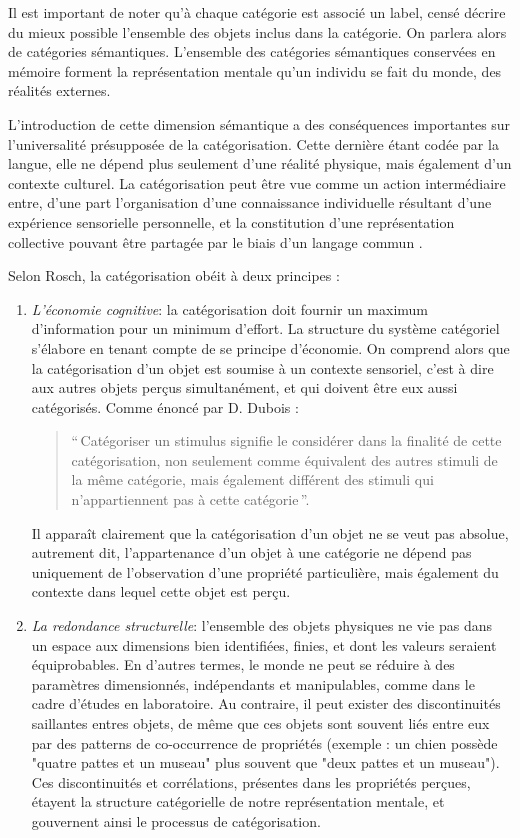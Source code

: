 Il est important de noter qu'à chaque catégorie est associé un label, censé décrire du mieux possible l'ensemble des objets inclus dans la catégorie. On parlera alors de catégories sémantiques. L'ensemble des catégories sémantiques conservées en mémoire forment la représentation mentale qu'un individu se fait du monde, des réalités externes. 

L'introduction de cette dimension sémantique a des conséquences importantes sur l'universalité présupposée de la catégorisation. Cette dernière étant codée par la langue, elle ne dépend plus seulement d'une réalité physique, mais également d'un contexte culturel. La catégorisation peut être vue comme un action intermédiaire entre, d'une part l'organisation d'une connaissance individuelle résultant d'une expérience sensorielle personnelle, et la constitution d'une représentation collective pouvant être partagée par le biais d'un langage commun \citep{dubois2006cognitive}. 

Selon Rosch, la catégorisation obéit à deux principes \citep[p. 29]{rosch1978cognition}:

\begin{enumerate}
\item \textit{L'économie cognitive}: la catégorisation doit fournir un maximum d'information pour un minimum d'effort. La structure du système catégoriel s'élabore en tenant compte de se principe d'économie. On comprend alors que la catégorisation d'un objet est soumise à un contexte sensoriel, c'est à dire aux autres objets perçus simultanément, et qui doivent être eux aussi catégorisés. Comme énoncé par D. Dubois \citep[p. 33]{dubois1991semantique}:
\begin{quote}
``\,Catégoriser un stimulus signifie le considérer dans la finalité de cette catégorisation, non seulement comme équivalent des autres stimuli de la même catégorie, mais également différent des stimuli qui n'appartiennent pas à cette catégorie\,''.
\end{quote}

Il apparaît clairement que la catégorisation d'un objet ne se veut pas absolue, autrement dit, l'appartenance d'un objet à une catégorie ne dépend pas uniquement de l'observation d'une propriété particulière, mais également du contexte dans lequel cette objet est perçu.

\item \textit{La redondance structurelle}: l'ensemble des objets physiques ne vie pas dans un espace aux dimensions bien identifiées, finies, et dont les valeurs seraient équiprobables. En d'autres termes, le monde ne peut se réduire à des paramètres dimensionnés, indépendants et manipulables, comme dans le cadre d'études en laboratoire. Au contraire, il peut exister des discontinuités saillantes entres objets, de même que ces objets sont souvent liés entre eux par des patterns de co-occurrence de propriétés (exemple : un chien possède "quatre pattes et un museau" plus souvent que "deux pattes et un museau"). Ces discontinuités et corrélations, présentes dans les propriétés perçues, étayent la structure catégorielle de notre représentation mentale,  et gouvernent ainsi le processus de catégorisation.
\end{enumerate} 

